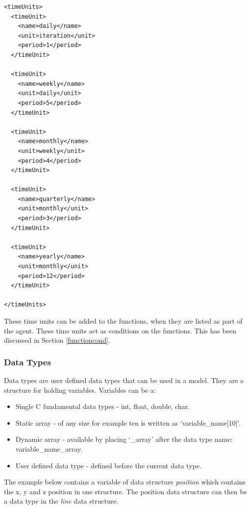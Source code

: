 \documentclass[a4paper,11pt]{article}
\newenvironment{mylisting}
{\begin{list}{}{\setlength{\leftmargin}{1em}}\item\small\bfseries}
{\end{list}}
\begin{document}
\begin{mylisting}
\begin{verbatim}
<timeUnits>
  <timeUnit>
    <name>daily</name>
    <unit>iteration</unit>
    <period>1</period>
  </timeUnit>

  <timeUnit>
    <name>weekly</name>
    <unit>daily</unit>
    <period>5</period>
  </timeUnit>

  <timeUnit>
    <name>monthly</name>
    <unit>weekly</unit>
    <period>4</period>
  </timeUnit>

  <timeUnit>
    <name>quarterly</name>
    <unit>monthly</unit>
    <period>3</period>
  </timeUnit>

  <timeUnit>
    <name>yearly</name>
    <unit>monthly</unit>
    <period>12</period>
  </timeUnit>

</timeUnits>
\end{verbatim}
\end{mylisting}

These time units can be added to the functions, when they are listed
as part of the agent. These time units act as conditions on the
functions. This has been discussed in Section \ref{functioncond}.

\subsubsection{Data Types}

Data types are user defined data types that can be used in a model.
They are a structure for holding variables. Variables can be a:

\begin{itemize}
  \item Single C fundamental data types - int, float, double, char.
  \item Static array - of any size for example ten is written as `variable\_name[10]'.
  \item Dynamic array - available by placing `\_array' after
  the data type name: variable\_name\_array.
  \item User defined data type - defined before the current data type.
\end{itemize}

The example below contains a variable of data structure
\emph{position} which contains the x, y and z position in one
structure. The position data structure can then be a data type in
the \emph{line} data structure.
\end{document}
